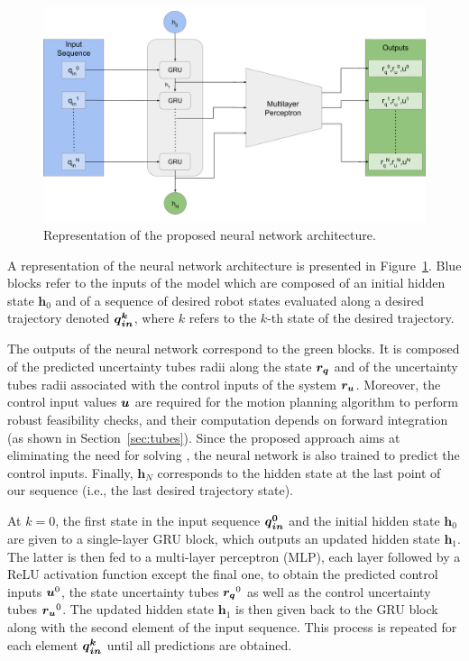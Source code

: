 \begin{figure} [t]
    \centering
    \includegraphics[width=0.8\linewidth]{figures/learning_quadrotor/SensiNN_GRU.png}%
    \caption{Representation of the proposed neural network architecture.
    }%
    \label{fig: NN}%
\end{figure}

A representation of the neural network architecture is presented in Figure~\ref{fig: NN}.
Blue blocks refer to the inputs of the model which are composed of an initial hidden state $\boldsymbol{h}_{0}$ and of a sequence of desired robot states evaluated along a desired trajectory denoted $\boldsymbol{\boldsymbol{q}_{in}^k}$, where $k$ refers to the $k$-th state of the desired trajectory. 

The outputs of the neural network correspond to the green blocks.
It is composed of the predicted uncertainty tubes radii along the state $\boldsymbol{r_q}$ and of the uncertainty tubes radii associated with the control inputs of the system $\boldsymbol{r_u}$.
Moreover, the control input values $\boldsymbol{u}$ are required for the motion planning algorithm to perform robust feasibility checks, and their computation depends on  forward integration (as shown in Section~\ref{sec:tubes}). 
Since the proposed approach aims at eliminating the need for solving , the neural network is also trained to predict the control inputs.
Finally, $\boldsymbol{h}_{N}$ corresponds to the hidden state at the last point of our sequence (i.e., the last desired trajectory state).

At $k=0$, the first state in the input sequence $\boldsymbol{\boldsymbol{q}_{in}^0}$ and the initial hidden state $\boldsymbol{h}_0$ are given to a single-layer GRU block, which outputs an updated hidden state $\boldsymbol{h}_1$. 
The latter is then fed to a multi-layer perceptron (MLP), each layer followed by a ReLU activation function except the final one, to obtain the predicted control inputs $\boldsymbol{u}^0$, the state uncertainty tubes $\boldsymbol{r_q}^0$ as well as the control uncertainty tubes $\boldsymbol{r_u}^0$. 
The updated hidden state $\boldsymbol{h}_1$ is then given back to the GRU block along with the second element of the input sequence. 
This process is repeated for each element $\boldsymbol{\boldsymbol{q}_{in}^k}$ until all predictions are obtained.

